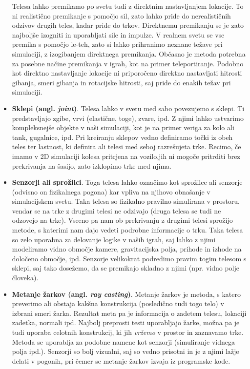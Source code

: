 \documentclass[12pt,a4paper,twoside]{book}
\begin{document}
\begin{itemize}
	Telesa lahko premikamo po svetu tudi z direktnim nastavljanjem lokacije. To ni realistično premikanje s pomočjo sil, zato lahko pride do nerealističnih odzivov drugih teles, kadar pride do trkov. Direktnemu premikanju se je zato najboljše izogniti in uporabljati sile in impulze. V realnem svetu se vse premika s pomočjo le-teh, zato si lahko prihranimo neznane težave pri simulaciji, z izogibanjem direktnega premikanja. Občasno je metoda potrebna za posebne načine premikanja v igrah, kot na primer teleportiranje. Podobno kot direktno nastavljanje lokacije ni priporočeno direktno nastavljati hitrosti gibanja, smeri gibanja in rotacijske hitrosti, saj pride do enakih težav pri simulaciji.
	\item \textbf{Sklepi (angl. \textit{joint})}. Telesa lahko v svetu med sabo povezujemo s sklepi. Ti predstavljajo zgibe, vrvi (elastične, toge), zvare, ipd. Z njimi lahko ustvarimo kompleksnejše objekte v naši simulaciji, kot je na primer veriga za kolo ali tank, gugalnice, ipd.  Pri kreiranju sklepov vedno definiramo točki iz obeh teles ter lastnost, ki definira ali telesi med seboj razrešujeta trke. Recimo, če imamo v 2D simulaciji kolesa pritrjena na vozilo,jih ni mogoče pritrditi brez prekrivanja na šasijo, zato izklopimo trke med njima.
	\item \textbf{Senzorji ali sprožilci}. Toga telesa lahko označimo kot sprožilce ali senzorje (odvisno on fizikalnega pogona) kar vpliva na njihovo obnašanje v simulacijskem svetu. Taka telesa so fizikalno pravilno simulirana v prostoru, vendar se na trke z drugimi telesi ne odzivajo (druga telesa se tudi ne odzovejo na trke). Vseeno pa nam ob prekrivanju z drugimi telesi sprožijo metode, s katerimi nam dajo vedeti podrobne informacije o trku. Taka telesa so zelo uporabna za delovanje logike v naših igrah, saj lahko z njimi modeliramo vidno območje kamere, gravitacijska polja, prihode in izhode na določeno območje, ipd. Senzorje velikokrat podredimo pravim togim telesom s sklepi, saj tako dosežemo, da se premikajo skladno z njimi (npr. vidno polje človeka).
	\item \textbf{Metanje žarkov (angl. \textit{ray casting})}. Metanje žarkov je metoda, s katero preverimo ali obstaja kakšna konstrukcija (posledično tudi togo telo) v izbrani smeri žarka. Rezultat meta pa je informacija o zadetem telesu, lokaciji zadetka, normali ipd. Najbolj preprosti testi uporabljajo žarke, možna pa je tudi uporaba celotnih konstrukcij, ki jih \textit{vržemo} v prostor in zaznavamo trke. Metoda se uporablja za podobne namene kot senzorji (simuliranje vidnega polja ipd.). Senzorji so bolj vizualni, saj so vedno prisotni in je z njimi lažje delati v pogonih, pri čemer se metanje žarkov izvaja iz programske kode.
\end{itemize}
\end{document}
